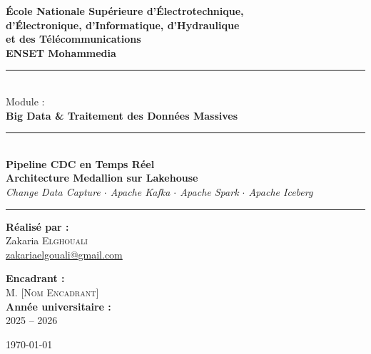 \documentclass[12pt,a4paper]{report}
\begin{document}
\begin{titlepage}
    \begin{center}
        \vspace*{0.5cm}
        {\Large\bfseries École Nationale Supérieure d'Électrotechnique,\\
        d'Électronique, d'Informatique, d'Hydraulique\\
        et des Télécommunications}\\[0.3cm]
        {\large\bfseries ENSET Mohammedia}\\[0.3cm]
        \rule{\linewidth}{0.6pt}\\[0.5cm]

        {\large Module :}\\[0.2cm]
        {\LARGE\bfseries Big Data \& Traitement des Données Massives}\\[1cm]

        \rule{\linewidth}{1.5pt}\\[0.8cm]

        {\fontsize{20}{24}\selectfont\bfseries
        Pipeline CDC en Temps Réel\\[0.3cm]
        Architecture Medallion sur Lakehouse}\\[0.5cm]
        {\large\itshape Change Data Capture $\cdot$ Apache Kafka $\cdot$
        Apache Spark $\cdot$ Apache Iceberg}

        \vspace{0.8cm}
        \rule{\linewidth}{1.5pt}

        \vspace{1.5cm}
        \begin{minipage}{0.45\textwidth}
            \begin{flushleft}
                \textbf{Réalisé par :}\\[0.3cm]
                Zakaria \textsc{Elghouali}\\[0.1cm]
                \small\href{mailto:zakariaelgouali@gmail.com}
                           {zakariaelgouali@gmail.com}
            \end{flushleft}
        \end{minipage}
        \hfill
        \begin{minipage}{0.45\textwidth}
            \begin{flushright}
                \textbf{Encadrant :}\\[0.3cm]
                M. \textsc{[Nom Encadrant]}\\[0.6cm]
                \textbf{Année universitaire :}\\[0.1cm]
                2025 -- 2026
            \end{flushright}
        \end{minipage}

        \vfill
        {\small\today}
    \end{center}
\end{titlepage}
\end{document}
